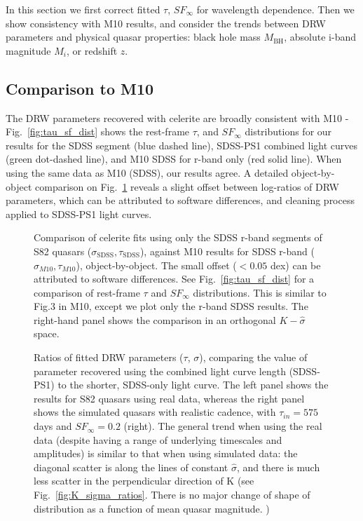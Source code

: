 \documentclass[twocolumn]{aastex62}
\newcommand{\project}[1]{\textsf{#1}}
\begin{document}
In this section we first correct fitted $\tau$, $SF_{\infty}$ for wavelength dependence. Then we show consistency with M10 results,  and consider the trends between DRW parameters and physical quasar properties: black hole mass $M_{\mathrm{BH}}$, absolute i-band  magnitude $M_{i}$, or redshift $z$.  


\subsection{Comparison to M10}
The DRW parameters recovered with \project{celerite} are  broadly consistent with M10 - Fig.~\ref{fig:tau_sf_dist} shows the rest-frame  $\tau$, and $SF_{\infty}$ distributions for our results for the SDSS segment (blue dashed line),  SDSS-PS1 combined light curves (green dot-dashed line), and  M10 SDSS for r-band only (red solid line). When using the same data as M10 (SDSS), our results agree. A detailed object-by-object comparison on Fig.~\ref{fig:sigma_tau_ratios_M10} reveals a slight offset between log-ratios of DRW parameters, which can be attributed to software differences, and cleaning process applied to SDSS-PS1 light curves.


\begin{figure*} %
\caption{Comparison of \project{celerite} fits using only the  SDSS r-band segments of S82 quasars ($\sigma_{\mathrm{SDSS}}, \tau_{\mathrm{SDSS}}$), against M10 results for SDSS r-band ($\sigma_{M10}, \tau_{M10}$), object-by-object. The small offset ($<0.05 $ dex) can be attributed to software differences. See Fig.~\ref{fig:tau_sf_dist} for a comparison of rest-frame $\tau$ and $SF_{\infty}$ distributions. This is similar to Fig.3 in M10, except we plot only the r-band SDSS results. The right-hand panel shows the comparison in an orthogonal $K-\hat{\sigma}$  space. } 
\label{fig:sigma_tau_ratios_M10}
\end{figure*} 



\begin{figure*} %
\caption{Ratios of fitted DRW parameters  ($\tau$, $\sigma$), comparing the value of parameter recovered using the combined light curve length (SDSS-PS1) to the shorter, SDSS-only light curve. The left panel shows the results for S82 quasars using real data, whereas the right panel shows the simulated quasars with realistic cadence, with  $\tau_{in}=575$ days and  $SF_{\infty}=0.2$ (right). The general trend when using the real data (despite having a range of underlying timescales and amplitudes) is similar to that when using simulated data: the diagonal scatter is along the lines of constant $\hat{\sigma}$, and there is much less scatter in the perpendicular direction of $\mathrm{K}$ (see Fig.~\ref{fig:K_sigma_ratios}. There is no major change of shape of distribution as a function of mean quasar magnitude. )
}
\label{fig:sigma_tau_ratios}
\end{figure*}
\end{document}
